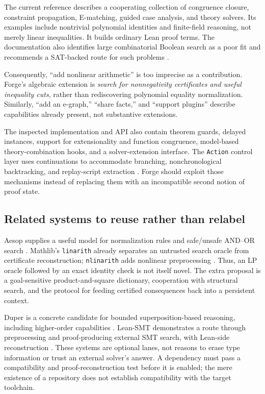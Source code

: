 \documentclass[11pt,a4paper]{article}
\newcommand{\code}[1]{\texttt{\small #1}}
\begin{document}
The current reference describes a cooperating collection of congruence closure,
constraint propagation, E-matching, guided case analysis, and theory solvers.
Its examples include nontrivial polynomial identities and finite-field
reasoning, not merely linear inequalities. It builds ordinary Lean proof
terms. The documentation also identifies large combinatorial Boolean search
as a poor fit and recommends a SAT-backed route for such problems
\cite{lean-grind}.

Consequently, ``add nonlinear arithmetic'' is too imprecise as a contribution.
Forge's algebraic extension is \emph{search for nonnegativity certificates and
useful inequality cuts}, rather than rediscovering polynomial equality
normalization. Similarly, ``add an e-graph,'' ``share facts,'' and ``support
plugins'' describe capabilities already present, not substantive extensions.

The inspected implementation and API also contain theorem guards, delayed
instances, support for extensionality and function congruence,
model-based theory-combination hooks, and a solver-extension interface.
The \code{Action} control layer uses continuations to accommodate branching,
nonchronological backtracking, and replay-script extraction
\cite{grind-types,grind-action}. Forge should exploit those mechanisms instead
of replacing them with an incompatible second notion of proof state.

\subsection{Related systems to reuse rather than relabel}

Aesop supplies a useful model for normalization rules and safe/unsafe
AND--OR search \cite{aesop}. Mathlib's \code{linarith} already separates an
untrusted search oracle from certificate reconstruction; \code{nlinarith}
adds nonlinear preprocessing \cite{linarith}. Thus, an LP oracle followed by an
exact identity check is not itself novel. The extra proposal is a goal-sensitive
product-and-square dictionary, cooperation with structural search, and the
protocol for feeding certified consequences back into a persistent context.

Duper is a concrete candidate for bounded superposition-based reasoning,
including higher-order capabilities \cite{duper}. Lean-SMT demonstrates a
route through preprocessing and proof-producing external SMT search, with
Lean-side reconstruction \cite{lean-smt}. These systems are optional lanes,
not reasons to erase type information or trust an external solver's answer.
A dependency must pass a compatibility and proof-reconstruction test before it
is enabled; the mere existence of a repository does not establish compatibility
with the target toolchain.
\end{document}
